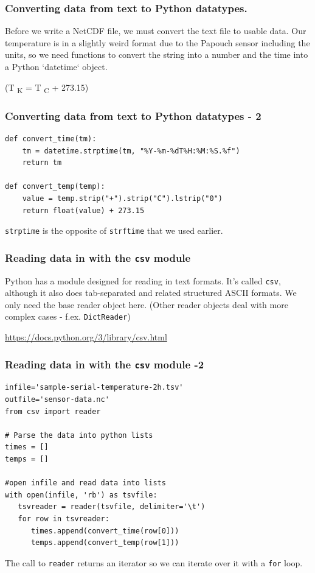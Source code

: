 \documentclass[aspectratio=1610,9pt]{beamer} %
\begin{document}
\begin{frame}
\frametitle{Converting data from text to Python
datatypes.}

Before we write a NetCDF file, we must convert the text file to usable
data. Our temperature is in a slightly weird format due to the Papouch
sensor including the units, so we need functions to convert the string
into a number and the time into a Python `datetime` object.

(T \textsubscript{K} = T \textsubscript{C} + 273.15)

\end{frame}
\begin{frame}[fragile]
\frametitle{Converting data from text to Python datatypes -
2}

\begin{verbatim}
def convert_time(tm):
    tm = datetime.strptime(tm, "%Y-%m-%dT%H:%M:%S.%f")
    return tm

def convert_temp(temp):
    value = temp.strip("+").strip("C").lstrip("0")
    return float(value) + 273.15
\end{verbatim}

\texttt{strptime} is the opposite of \texttt{strftime} that we used
earlier.

\end{frame}
\begin{frame}
\frametitle{Reading data in with the \texttt{csv}
module}

Python has a module designed for reading in text formats. It's called
\texttt{csv}, although it also does tab-separated and related structured
ASCII formats. We only need the base reader object here. (Other reader
objects deal with more complex cases - f.ex. \texttt{DictReader})

\url{https://docs.python.org/3/library/csv.html}

\end{frame}
\begin{frame}[fragile]
\frametitle{Reading data in with the \texttt{csv} module
-2}

\begin{verbatim}
infile='sample-serial-temperature-2h.tsv'
outfile='sensor-data.nc'
from csv import reader

# Parse the data into python lists
times = []
temps = []

#open infile and read data into lists
with open(infile, 'rb') as tsvfile:
   tsvreader = reader(tsvfile, delimiter='\t')
   for row in tsvreader:
      times.append(convert_time(row[0]))
      temps.append(convert_temp(row[1]))
\end{verbatim}

The call to \texttt{reader} returns an iterator so we can iterate over
it with a \texttt{for} loop.

\end{frame}
\end{document}
